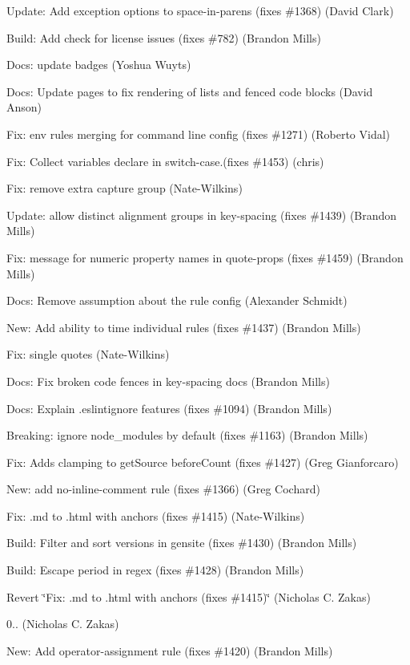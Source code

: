 \begin{DoxyItemize}
\item Update\+: Add exception options to space-\/in-\/parens (fixes \#1368) (David Clark)
\item Build\+: Add check for license issues (fixes \#782) (Brandon Mills)
\item Docs\+: update badges (Yoshua Wuyts)
\item Docs\+: Update pages to fix rendering of lists and fenced code blocks (David Anson)
\item Fix\+: env rules merging for command line config (fixes \#1271) (Roberto Vidal)
\item Fix\+: Collect variables declare in switch-\/case.(fixes \#1453) (chris)
\item Fix\+: remove extra capture group (Nate-\/\+Wilkins)
\item Update\+: allow distinct alignment groups in key-\/spacing (fixes \#1439) (Brandon Mills)
\item Fix\+: message for numeric property names in quote-\/props (fixes \#1459) (Brandon Mills)
\item Docs\+: Remove assumption about the rule config (Alexander Schmidt)
\item New\+: Add ability to time individual rules (fixes \#1437) (Brandon Mills)
\item Fix\+: single quotes (Nate-\/\+Wilkins)
\item Docs\+: Fix broken code fences in key-\/spacing docs (Brandon Mills)
\item Docs\+: Explain .eslintignore features (fixes \#1094) (Brandon Mills)
\item Breaking\+: ignore node\+\_\+modules by default (fixes \#1163) (Brandon Mills)
\item Fix\+: Adds clamping to get\+Source before\+Count (fixes \#1427) (Greg Gianforcaro)
\item New\+: add no-\/inline-\/comment rule (fixes \#1366) (Greg Cochard)
\item Fix\+: \textquotesingle{}.md\textquotesingle{} to \textquotesingle{}.html\textquotesingle{} with anchors (fixes \#1415) (Nate-\/\+Wilkins)
\item Build\+: Filter and sort versions in gensite (fixes \#1430) (Brandon Mills)
\item Build\+: Escape period in regex (fixes \#1428) (Brandon Mills)
\item Revert \char`\"{}\+Fix\+: \textquotesingle{}.\+md\textquotesingle{} to \textquotesingle{}.\+html\textquotesingle{} with anchors (fixes \#1415)\char`\"{} (Nicholas C. Zakas)
\item 0.. (Nicholas C. Zakas)
\item New\+: Add operator-\/assignment rule (fixes \#1420) (Brandon Mills)
\end{DoxyItemize}


